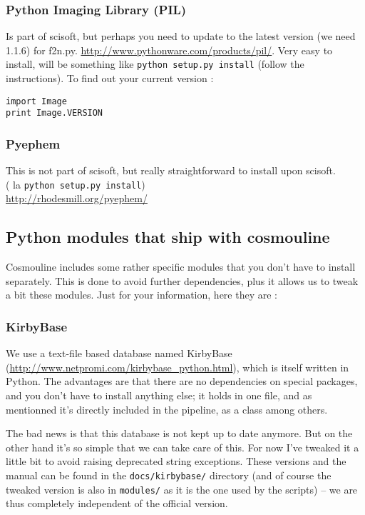 \subsubsection{Python Imaging Library (PIL)}
Is part of scisoft, but perhaps you need to update to the latest version (we need 1.1.6) for f2n.py.
\url{http://www.pythonware.com/products/pil/}. Very easy to install, will be something like \verb+python setup.py install+ (follow the instructions).
To find out your current version :
\begin{lstlisting}
import Image
print Image.VERSION
\end{lstlisting}


\subsubsection{Pyephem}
This is not part of scisoft, but really straightforward to install upon scisoft. \\
( la \verb+python setup.py install+)\\
\url{http://rhodesmill.org/pyephem/}


\subsection{Python modules that ship with cosmouline}
Cosmouline includes some rather specific modules that you don't have to install separately. This is done to avoid further dependencies, plus it allows us to tweak a bit these modules. Just for your information, here they are :

\subsubsection{KirbyBase}
\label{kirby}
We use a text-file based database named KirbyBase (\url{http://www.netpromi.com/kirbybase_python.html}), which is itself written in Python. The advantages are that there are no dependencies on special packages, and you don't have to install anything else; it holds in one file, and as mentionned it's directly included in the pipeline, as a class among others.

The bad news is that this database is not kept up to date anymore. But on the other hand it's so simple that we can take care of this. For now I've tweaked it a little bit to avoid raising deprecated string exceptions. These versions and the manual can be found in the \verb+docs/kirbybase/+ directory (and of course the tweaked version is also in \verb+modules/+ as it is the one used by the scripts) -- we are thus completely independent of the official version.

